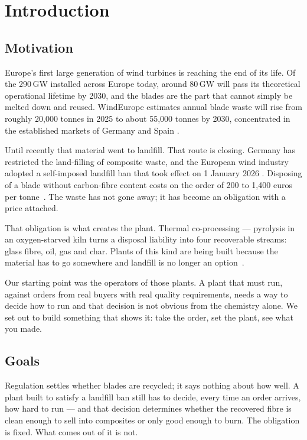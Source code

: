 \section{Introduction}

\subsection{Motivation}

Europe's first large generation of wind turbines is reaching the end of its life. Of the 290\,GW installed across Europe today, around 80\,GW will pass its theoretical operational lifetime by 2030, and the blades are the part that cannot simply be melted down and reused. WindEurope estimates annual blade waste will rise from roughly 20,000 tonnes in 2025 to about 55,000 tonnes by 2030, concentrated in the established markets of Germany and Spain \cite{windeurope}.

Until recently that material went to landfill. That route is closing. Germany has restricted the land-filling of composite waste, and the European wind industry adopted a self-imposed landfill ban that took effect on 1 January 2026 \cite{windeuropeban}. Disposing of a blade without carbon-fibre content costs on the order of 200 to 1,400 euros per tonne~\cite{envecon}. The waste has not gone away; it has become an obligation with a price attached.

That obligation is what creates the plant. Thermal co-processing --- pyrolysis in an oxygen-starved kiln turns a disposal liability into four recoverable streams: glass fibre, oil, gas and char. Plants of this kind are being built because the material has to go somewhere and landfill is no longer an option~\cite{noblade}.

Our starting point was the operators of those plants. A plant that must run, against orders from real buyers with real quality requirements, needs a way to decide how to run and that decision is not obvious from the chemistry alone. We set out to build something that shows it: take the order, set the plant, see what you made.

\subsection{Goals}

Regulation settles whether blades are recycled; it says nothing about how well. A plant built to satisfy a landfill ban still has to decide, every time an order arrives, how hard to run --- and that decision determines whether the recovered fibre is clean enough to sell into composites or only good enough to burn. The obligation is fixed. What comes out of it is not.


